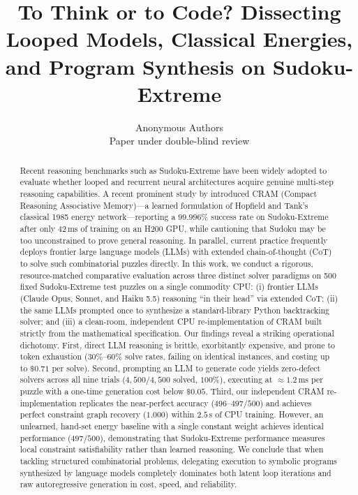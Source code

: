 \documentclass{article} %
\title{To Think or to Code? Dissecting Looped Models, Classical Energies, and Program Synthesis on Sudoku-Extreme}
\author{Anonymous Authors\\
Paper under double-blind review
}
\begin{document}
\maketitle

\begin{abstract}
Recent reasoning benchmarks such as Sudoku-Extreme have been widely adopted to evaluate whether looped and recurrent neural architectures acquire genuine multi-step reasoning capabilities. A recent prominent study by \citet{hoover2026cram} introduced CRAM (Compact Reasoning Associative Memory)---a learned formulation of Hopfield and Tank's classical 1985 energy network---reporting a $99.996\%$ success rate on Sudoku-Extreme after only $42\,\mathrm{ms}$ of training on an H200 GPU, while cautioning that Sudoku may be too unconstrained to prove general reasoning. In parallel, current practice frequently deploys frontier large language models (LLMs) with extended chain-of-thought (CoT) to solve such combinatorial puzzles directly. In this work, we conduct a rigorous, resource-matched comparative evaluation across three distinct solver paradigms on 500 fixed Sudoku-Extreme test puzzles on a single commodity CPU: (i) frontier LLMs (Claude Opus, Sonnet, and Haiku 5.5) reasoning ``in their head'' via extended CoT; (ii) the same LLMs prompted once to synthesize a standard-library Python backtracking solver; and (iii) a clean-room, independent CPU re-implementation of CRAM built strictly from the mathematical specification. Our findings reveal a striking operational dichotomy. First, direct LLM reasoning is brittle, exorbitantly expensive, and prone to token exhaustion ($30\%\text{--}60\%$ solve rates, failing on identical instances, and costing up to $\$0.71$ per solve). Second, prompting an LLM to generate code yields zero-defect solvers across all nine trials ($4{,}500/4{,}500$ solved, $100\%$), executing at $\approx 1.2\,\mathrm{ms}$ per puzzle with a one-time generation cost below $\$0.05$. Third, our independent CRAM re-implementation replicates the near-perfect accuracy ($496\text{--}497/500$) and achieves perfect constraint graph recovery ($1.000$) within $2.5\,\mathrm{s}$ of CPU training. However, an unlearned, hand-set energy baseline with a single constant weight achieves identical performance ($497/500$), demonstrating that Sudoku-Extreme performance measures local constraint satisfiability rather than learned reasoning. We conclude that when tackling structured combinatorial problems, delegating execution to symbolic programs synthesized by language models completely dominates both latent loop iterations and raw autoregressive generation in cost, speed, and reliability.
\end{abstract}
\end{document}
